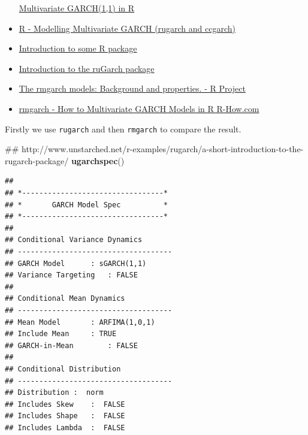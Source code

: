 \documentclass[]{tufte-book}
\newenvironment{Shaded}{}{}
\newcommand{\KeywordTok}[1]{\textcolor[rgb]{0.00,0.44,0.13}{\textbf{#1}}}
\newcommand{\NormalTok}[1]{#1}
\begin{document}
\begin{itemize}
  \href{https://stackoverflow.com/questions/35035857/multivariate-garch1-1-in-r?answertab=votes\#tab-top}{{Multivariate
  GARCH(1,1) in R}}
\item
  \href{https://stackoverflow.com/questions/16874375/r-modelling-multivariate-garch-rugarch-and-ccgarch?answertab=votes\#tab-top}{{R
  - Modelling Multivariate GARCH (rugarch and ccgarch)}}
\item
  \href{./reference/Introduction\%20to\%20some\%20R\%20packages.pdf}{{Introduction
  to some R package}}
\item
  \href{./reference/Introduction\%20to\%20the\%20rugarch\%20package.pdf}{{Introduction
  to the ruGarch package}}
\item
  \href{./reference/The\%20rmgarch\%20models\%20-\%20Background\%20and\%20Properties.pdf}{{The
  rmgarch models: Background and properties. - R Project}}
\item
  \href{https://r-how.com/packages/rmgarch}{{rmgarch - How to
  Multivariate GARCH Models in R \textbar{} R-How.com}}
\end{itemize}

Firstly we use \texttt{rugarch} and then \texttt{rmgarch} to compare the
result.

\begin{Shaded}
\begin{Highlighting}[]
\NormalTok{## http://www.unstarched.net/r-examples/rugarch/a-short-introduction-to-the-rugarch-package/}
\KeywordTok{ugarchspec}\NormalTok{()}
\end{Highlighting}
\end{Shaded}

\begin{verbatim}
## 
## *---------------------------------*
## *       GARCH Model Spec          *
## *---------------------------------*
## 
## Conditional Variance Dynamics    
## ------------------------------------
## GARCH Model      : sGARCH(1,1)
## Variance Targeting   : FALSE 
## 
## Conditional Mean Dynamics
## ------------------------------------
## Mean Model       : ARFIMA(1,0,1)
## Include Mean     : TRUE 
## GARCH-in-Mean        : FALSE 
## 
## Conditional Distribution
## ------------------------------------
## Distribution :  norm 
## Includes Skew    :  FALSE 
## Includes Shape   :  FALSE 
## Includes Lambda  :  FALSE
\end{verbatim}
\end{document}
